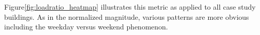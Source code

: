 

Figure\ref{fig:loadratio_heatmap} illustrates this metric as applied to all case study buildings. As in the normalized magnitude, various patterns are more obvious including the weekday versus weekend phenomenon.